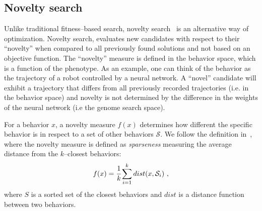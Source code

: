 \documentclass{sig-alternate}
\begin{document}
\subsection{Novelty search}

Unlike traditional fitness--based search, novelty search~\cite{lehman2008exploiting,lehman2011abandoning,lehman2010revising, risi2009novelty} is an alternative way of optimization. Novelty search, evaluates new candidates with respect to their ``novelty'' when compared to all previously found solutions and not based on an objective function. The ``novelty'' measure is defined in the behavior space, which is a function of the phenotype. As an example, one can think of the behavior as the trajectory of a robot controlled by a neural network. A ``novel'' candidate will exhibit a trajectory that differs from all previously recorded trajectories (i.e. in the behavior space) and novelty is not determined by the difference in the weights of the neural network (i.e the genome search space).


For a behavior $x$, a novelty measure $f(x)$ determines how different the specific behavior is in respect to a set of other behaviors $\mathcal{S}$. We follow the definition in~\cite{lehman2008exploiting,lehman2011abandoning}, where the novelty measure is defined as \emph{sparseness} measuring the average distance from the $k$--closest behaviors:
\begin{equation}
\label{sparsenessEquation}
f(x) = \cfrac{1}{k} \sum_{i=1}^{k} dist(x, \mathcal{S}_i)\ , 
\end{equation}
where $S$ is a sorted set of the closest behaviors and $dist$ is a distance function between two behaviors.



\end{document}
